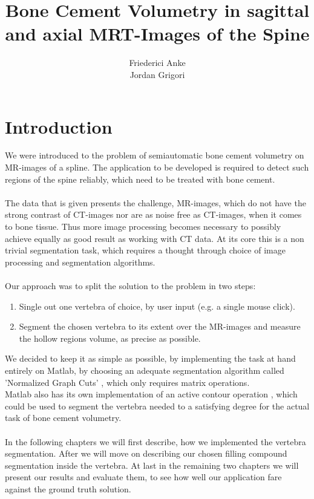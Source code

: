 \documentclass{article}
\title{Bone Cement Volumetry in sagittal and axial MRT-Images of the Spine}
\author{Friederici Anke\\ Jordan Grigori}
\begin{document}
  
  \begin{titlepage}
  	\centering
	
  \end{titlepage}
  
  \maketitle
  \thispagestyle{empty}
  \pagebreak
  
  \section{Introduction}
  \setcounter{page}{1}
  {
  	We were introduced to the problem of semiautomatic bone cement volumetry 
  	on MR-images of a spline. The application to be developed is required 
  	to detect such regions of the spine reliably, which need to be treated with 
  	bone cement.\\
  	\\The data that is given presents the challenge, MR-images, which do not have
  	the strong contrast of CT-images nor are as noise free as CT-images, when it
  	comes to bone tissue. Thus more image processing becomes necessary to possibly 
  	achieve equally as good result as working with CT data.
  	At its core this is a non trivial segmentation task, which requires a thought 
  	through choice of image processing and segmentation algorithms.\\
  	\\Our approach was to split the solution to the problem in two steps:
  	\begin{enumerate}
  		\item Single out one vertebra of choice, by user input (e.g. a single mouse click).
  		\item Segment the chosen vertebra to its extent over the MR-images and measure the hollow regions volume, as precise as possible.
  	\end{enumerate}
  	We decided to keep it as simple as possible, by implementing the task at hand 
  	entirely on Matlab, by choosing an adequate segmentation algorithm called 
  	'Normalized Graph Cuts' \cite{[ShiMalik00]}, which only requires matrix operations.
  	\\Matlab also has its own implementation of an active contour
  	operation \cite{[ChanVese01]}, which could be used to segment the vertebra needed to a satisfying degree for the actual task of bone cement volumetry.\\	
  	\\In the following chapters we will first describe, how we implemented the vertebra segmentation.
  	After we will move on describing our chosen filling compound segmentation inside the vertebra.
  	At last in the remaining two chapters we will present our results and evaluate them, to see how well our application fare against the ground truth solution.
  }
  \pagebreak
\end{document}
